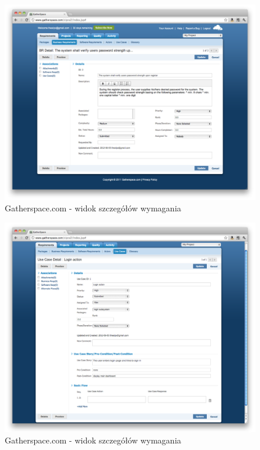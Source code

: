       \begin{figure}[t]
        \centering
        \includegraphics[width=1.0\textwidth]{img/gatherspace_7.pdf}
        \caption{Gatherspace.com - widok szczegółów wymagania}
        \label{fig:gatherspace_7}
      \end{figure}

      \begin{figure}[t]
        \centering
        \includegraphics[width=1.0\textwidth]{img/gatherspace_8.pdf}
        \caption{Gatherspace.com - widok szczegółów wymagania}
        \label{fig:gatherspace_8}
      \end{figure}

